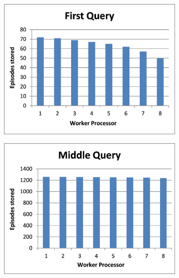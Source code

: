 \documentclass[11pt]{article} %
\begin{document}
\begin{figure}
        \centering
        \begin{subfigure}[b]{0.33\textwidth}
                \centering
                \includegraphics[width=\textwidth]{images/firstquery2}
                \label{fig:longdynam1}
        \end{subfigure}%
        \begin{subfigure}[b]{0.33\textwidth}
                \centering
                \includegraphics[width=\textwidth]{images/longmiddlequery}
                \label{fig:longdynam2}

\end{subfigure}
\end{figure}
\end{document}
